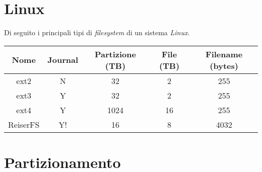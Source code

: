 \section{Linux}
Di seguito i principali tipi di \textit{filesystem} di un sistema \textit{Linux}.
\begin{center}
    \begin{tabular}{|c|c|c|c|c|}
        \hline
        \textbf{Nome} & \textbf{Journal} & \textbf{Partizione (TB)} & \textbf{File (TB)} & \textbf{Filename (bytes)} \\ \hline
        ext2        & N     & 32    & 2     & 255   \\ \hline
        ext3        & Y     & 32    & 2     & 255   \\ \hline
        ext4        & Y     & 1024  & 16    & 255   \\ \hline
        ReiserFS    & Y!    & 16    & 8     & 4032  \\ \hline
    \end{tabular}
\end{center}

\section{Partizionamento}
